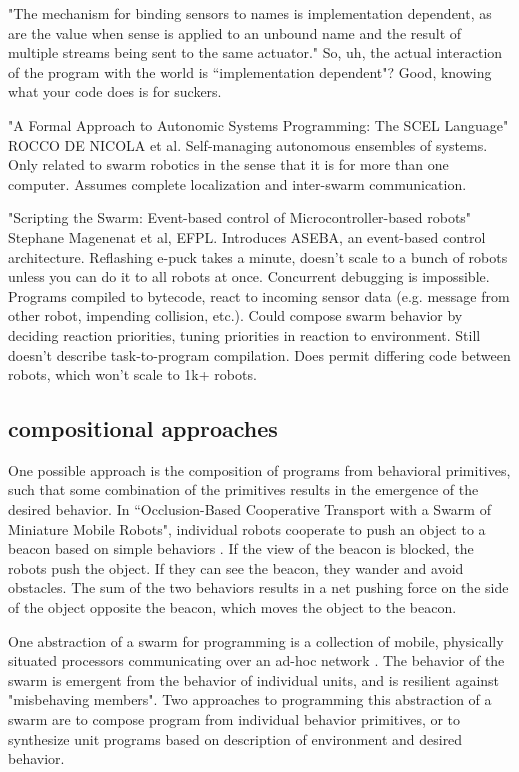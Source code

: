 \documentclass[]{article}
\begin{document}
"The mechanism for binding sensors to names is implementation dependent, as are the value when sense is applied to an unbound name and the result of multiple streams being sent to the same actuator." So, uh, the actual interaction of the program with the world is ``implementation dependent"? Good, knowing what your code does is for suckers. 

"A Formal Approach to Autonomic Systems Programming: The SCEL Language" \cite{nicola2014formal} ROCCO DE NICOLA et al. Self-managing autonomous ensembles of systems. Only related to swarm robotics in the sense that it is for more than one computer. Assumes complete localization and inter-swarm communication. 

"Scripting the Swarm: Event-based control of Microcontroller-based robots" \cite{magnenat2008scripting} Stephane Magenenat et al, EFPL. Introduces ASEBA, an event-based control architecture. Reflashing e-puck takes a minute, doesn't scale to a bunch of robots unless you can do it to all robots at once. Concurrent debugging is impossible. Programs compiled to bytecode, react to incoming sensor data (e.g. message from other robot, impending collision, etc.). Could compose swarm behavior by deciding reaction priorities, tuning priorities in reaction to environment. Still doesn't describe task-to-program compilation. Does permit differing code between robots, which won't scale to 1k+ robots.

\subsection{compositional approaches}

One possible approach is the composition of programs from behavioral primitives, such that some combination of the primitives results in the emergence of the desired behavior. 
In ``Occlusion-Based Cooperative Transport with a Swarm of Miniature Mobile Robots", individual robots cooperate to push an object to a beacon based on simple behaviors \cite{chen2015occlusion}. 
If the view of the beacon is blocked, the robots push the object. 
If they can see the beacon, they wander and avoid obstacles. 
The sum of the two behaviors results in a net pushing force on the side of the object opposite the beacon, which moves the object to the beacon. 

One abstraction of a swarm for programming is a collection of mobile, physically situated processors communicating over an ad-hoc network \cite{evans2000programming}. The behavior of the swarm is emergent from the behavior of individual units, and is  resilient against "misbehaving members".
Two approaches to programming this abstraction of a swarm are to compose program from individual behavior primitives, or to synthesize unit programs based on description of environment and desired behavior. 
\end{document}
